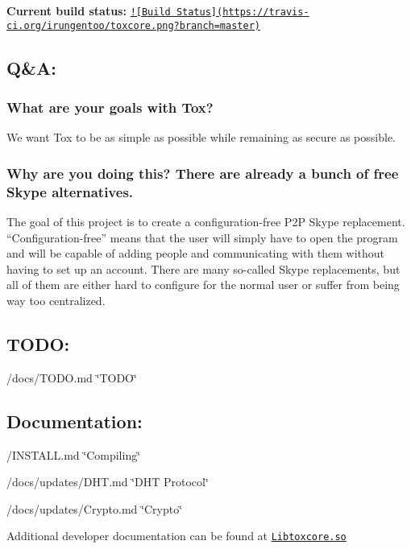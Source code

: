 {\bfseries Current build status\+:} \href{https://travis-ci.org/irungentoo/toxcore}{\tt !\mbox{[}Build Status\mbox{]}(https\+://travis-\/ci.\+org/irungentoo/toxcore.\+png?branch=master)}

\subsection*{Q\&A\+:}

\subsubsection*{What are your goals with Tox?}

We want Tox to be as simple as possible while remaining as secure as possible.

\subsubsection*{Why are you doing this? There are already a bunch of free Skype alternatives.}

The goal of this project is to create a configuration-\/free P2\+P Skype replacement. “\+Configuration-\/free” means that the user will simply have to open the program and will be capable of adding people and communicating with them without having to set up an account. There are many so-\/called Skype replacements, but all of them are either hard to configure for the normal user or suffer from being way too centralized.

\subsection*{T\+O\+D\+O\+:}


\begin{DoxyItemize}
\item /docs/\+T\+O\+D\+O.md \char`\"{}\+T\+O\+D\+O\char`\"{}
\end{DoxyItemize}

\subsection*{Documentation\+:}


\begin{DoxyItemize}
\item /\+I\+N\+S\+T\+A\+L\+L.md \char`\"{}\+Compiling\char`\"{}
\item /docs/updates/\+D\+H\+T.md \char`\"{}\+D\+H\+T Protocol\char`\"{}~\newline

\item /docs/updates/\+Crypto.md \char`\"{}\+Crypto\char`\"{}~\newline

\end{DoxyItemize}

Additional developer documentation can be found at \href{https://libtoxcore.so/}{\tt Libtoxcore.\+so} 